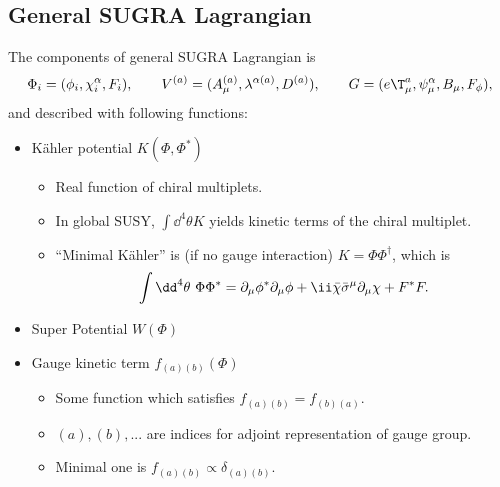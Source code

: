 \subsection{General SUGRA Lagrangian}
The components of general SUGRA Lagrangian is
\begin{equation}
 \Phi_i = (\phi_i,\chi^\alpha_i,F_i),\qquad
 V^{(a)}=(A^{(a)}_\mu,\lambda^{\alpha(a)},D^{(a)}),\qquad
 G=(\bein \mu a,\psi_\mu^\alpha,B_\mu,F_\phi),
\end{equation}
and described with following functions:
\begin{itemize}
 \item K\"ahler potential $K(\Phi,\Phi^*)$
\begin{itemize}
 \item Real function of chiral multiplets.
 \item In global SUSY, $\int\dd^4\theta K$ yields kinetic terms of the
       chiral multiplet.
 \item ``Minimal K\"ahler'' is (if no gauge interaction)
       $K=\Phi\Phi^\dagger$, which is
\begin{equation}
 \int\dd^4\theta\ \Phi\Phi^*=\Pm \phi^*\Pm\phi+\ii\bar\chi\bSm\Pm
  \chi + F^*F.
\end{equation}
\end{itemize}
 \item Super Potential $W(\Phi)$
 \item Gauge kinetic term $f_{(a)(b)}(\Phi)$
\begin{itemize}
 \item Some function which satisfies $f_{(a)(b)} = f_{(b)(a)}$.
 \item $(a), (b), ...$ are indices for adjoint representation of gauge
       group.
 \item Minimal one is $f_{(a)(b)} \propto \delta_{(a)(b)}.$
\end{itemize}
\end{itemize}

